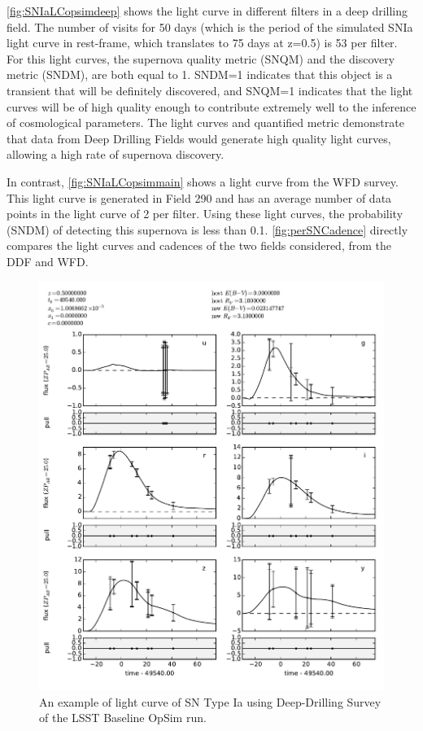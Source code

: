 \autoref{fig:SNIaLCopsimdeep} shows the light curve in
different filters in a deep drilling field. The
number of visits for 50 days (which is the period of the simulated SNIa light curve in
rest-frame, which translates to 75 days at z=0.5) is 53 per filter. For this light
curves, the supernova quality metric (SNQM) and the
discovery metric (SNDM), are both equal to 1. SNDM=1 indicates that this object is a transient that
will be definitely discovered, and SNQM=1 indicates that the light
curves will be of high quality enough to contribute extremely well to
the inference of cosmological parameters. The light curves and
quantified metric demonstrate that data from Deep Drilling Fields would
generate high quality light curves, allowing a high rate of supernova
discovery.

In contrast, \autoref{fig:SNIaLCopsimmain} shows a light curve from the WFD survey. This light 
curve is
generated in Field 290 and has an average number
of data points in the light curve of 2 per filter. Using these light
curves, the probability (SNDM) of detecting this supernova is less
than 0.1. \autoref{fig:perSNCadence} directly compares the light curves and cadences of the two 
fields considered, from the DDF and WFD. 

\begin{figure}
\includegraphics[angle=0,width=14truecm]{figs/SN_290_lc.pdf}
\caption{An example of light curve of SN Type Ia using Deep-Drilling
Survey of the LSST Baseline OpSim run.
}
\label{fig:SNIaLCopsimdeep}
\end{figure}

